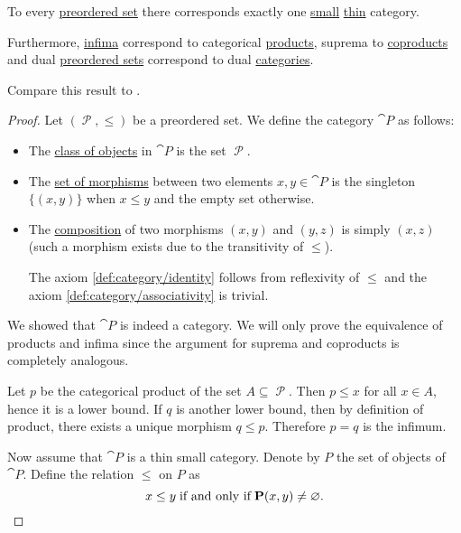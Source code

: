 \begin{proposition}\label{thm:preorder_category_correspondence}
  To every \hyperref[def:preordered_set]{preordered set} there corresponds exactly one \hyperref[def:small_and_large_categories]{small} \hyperref[def:thin_category]{thin} category.

  Furthermore, \hyperref[def:poset_extremal_points/supremum_and_infimum]{infima} correspond to categorical \hyperref[def:categorical_product]{products}, suprema to \hyperref[def:categorical_coproduct]{coproducts} and dual \hyperref[def:preordered_set/duality]{preordered sets} correspond to dual \hyperref[def:opposite_category]{categories}.

  Compare this result to .
\end{proposition}
\begin{proof}
  \SufficiencySubProof Let \( (\mscrP, \leq) \) be a preordered set. We define the category \( \cat{P} \) as follows:
  \begin{itemize}
    \item The \hyperref[def:category/C1]{class of objects} in \( \cat{P} \) is the set \( \mscrP \).
    \item The \hyperref[def:category/C2]{set of morphisms} between two elements \( x, y \in \cat{P} \) is the singleton \( \{ (x, y) \} \) when \( x \leq y \) and the empty set otherwise.
    \item The \hyperref[def:category/C3]{composition} of two morphisms \( (x, y) \) and \( (y, z) \) is simply \( (x, z) \) (such a morphism exists due to the transitivity of \( \leq \)).

    The axiom \ref{def:category/identity} follows from reflexivity of \( \leq \) and the axiom \ref{def:category/associativity} is trivial.
  \end{itemize}

  We showed that \( \cat{P} \) is indeed a category. We will only prove the equivalence of products and infima since the argument for suprema and coproducts is completely analogous.

  Let \( p \) be the categorical product of the set \( A \subseteq \mscrP \). Then \( p \leq x \) for all \( x \in A \), hence it is a lower bound. If \( q \) is another lower bound, then by definition of product, there exists a unique morphism \( q \leq p \). Therefore \( p = q \) is the infimum.

  \NecessitySubProof Now assume that \( \cat{P} \) is a thin small category. Denote by \( P \) the set of objects of \( \cat{P} \). Define the relation \( \leq \) on \( P \) as
  \begin{equation*}
    x \leq y \T{if and only if} \cat{P}(x, y) \neq \varnothing.
  \end{equation*}


\end{proof}
